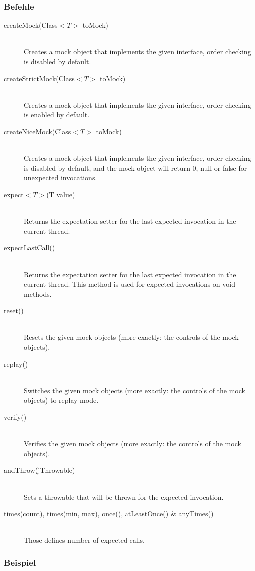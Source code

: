 \documentclass[a4paper,10pt]{article}
\begin{document}
\subsubsection{Befehle}
\begin{description}
	\item[createMock(Class$<T>$ toMock)] \hfill \\
		Creates a mock object that implements the given interface, order checking is disabled by default.
	\item[createStrictMock(Class$<T>$ toMock)] \hfill \\
		Creates a mock object that implements the given interface, order checking is enabled by default.
	\item[createNiceMock(Class$<T>$ toMock)] \hfill \\
		Creates a mock object that implements the given interface, order checking is disabled by default, and the mock object will return 0, null or false for unexpected invocations.
	\item[expect$<T>$(T value)] \hfill \\
		Returns the expectation setter for the last expected invocation in the current thread.
	\item[expectLastCall()] \hfill \\
		Returns the expectation setter for the last expected invocation in the current thread. This method is used for expected invocations on void methods. 
	\item[reset()] \hfill \\
		Resets the given mock objects (more exactly: the controls of the mock objects).
	\item[replay()] \hfill \\
		 Switches the given mock objects (more exactly: the controls of the mock objects) to replay mode.
	\item[verify()] \hfill \\
		Verifies the given mock objects (more exactly: the controls of the mock objects).	 
	\item[andThrow(jThrowable)] \hfill \\
		Sets a throwable that will be thrown for the expected invocation.
	\item[times(count), times(min, max), once(), atLeastOnce() \& anyTimes()] \hfill \\
		Those defines number of expected calls.
\end{description}
\subsubsection{Beispiel}

\end{document}
